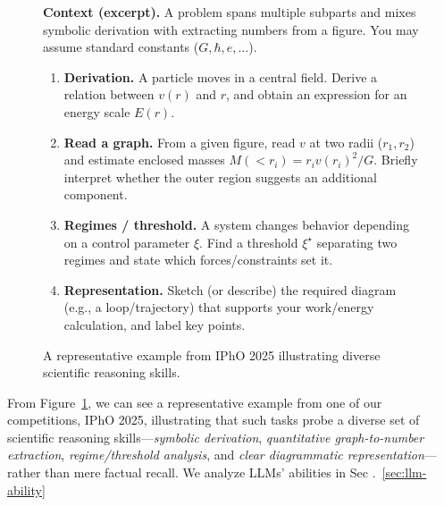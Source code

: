 \documentclass[11pt]{article}
\newcommand{\pts}[1]{\qquad{\small(#1 pts)}}
\begin{document}
\begin{figure}[htbp]
    \centering
    \begin{tcolorbox}[
      title={A case of IPhO 2025 problem. (stylized vignette)},
      colback=gray!3,
      colframe=black!35,
      boxrule=0.6pt,
      arc=1.5mm,
      left=1.5mm,right=1.5mm,top=1mm,bottom=1mm
    ]
    \small
    \textbf{Context (excerpt).}
    A problem spans multiple subparts and mixes symbolic derivation with extracting numbers from a figure.
    You may assume standard constants ($G,\hbar,e,\ldots$).

    \vspace{0.2em}
    \begin{enumerate}[leftmargin=1.2em,itemsep=0.2em]
      \item \textbf{Derivation.} A particle moves in a central field. Derive a relation between $v(r)$ and $r$,
            and obtain an expression for an energy scale $E(r)$. \pts{0.8}
      \item \textbf{Read a graph.} From a given figure, read $v$ at two radii ($r_1,r_2$) and estimate
            enclosed masses $M(<r_i)=r_i v(r_i)^2/G$. Briefly interpret whether the outer region suggests an additional component. \pts{1.0}
      \item \textbf{Regimes / threshold.} A system changes behavior depending on a control parameter $\xi$.
            Find a threshold $\xi^\star$ separating two regimes and state which forces/constraints set it. \pts{0.8}
      \item \textbf{Representation.} Sketch (or describe) the required diagram (e.g., a loop/trajectory) that supports your
            work/energy calculation, and label key points. \pts{0.4}
    \end{enumerate}
    \end{tcolorbox}

    \caption{A representative example from IPhO 2025 illustrating diverse scientific reasoning skills.}
    
    \label{fig:example}
\end{figure}
From Figure~\ref{fig:example}, we can see a representative example from one of our competitions, IPhO 2025, illustrating that such tasks probe a diverse set of scientific reasoning skills—\emph{symbolic derivation}, \emph{quantitative graph-to-number extraction}, \emph{regime/threshold analysis}, and \emph{clear diagrammatic representation}—rather than mere factual recall. 
We analyze LLMs' abilities in Sec .~\ref {sec:llm-ability}
\end{document}
